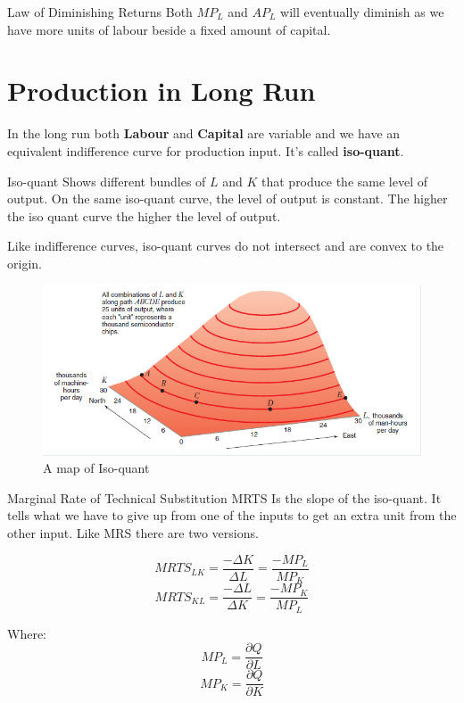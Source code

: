 \documentclass[../ECON-281-Notes.tex]{subfiles}
\begin{document}
\begin{Theorem}
    {Law of Diminishing Returns}
    Both \(MP_L\) and \(AP_L\) will eventually diminish as we have more units of labour beside a fixed amount of capital. 
\end{Theorem}

\section{Production in Long Run}
In the long run both \textbf{Labour} and \textbf{Capital} are variable and we have an equivalent indifference curve for production input. It's called \textbf{iso-quant}.

\begin{Definition}
    {Iso-quant}
    Shows different bundles of \(L\) and \(K\) that produce the same level of output.
    On the same iso-quant curve, the level of output is constant. The higher the iso quant curve the higher the level of output.

    Like indifference curves, iso-quant curves do not intersect and are convex to the origin. 
\end{Definition}
\begin{figure}[h]
    \centering
    \includegraphics[width=\columnwidth]{../assets/isoquant.png}
    \caption{A map of Iso-quant}
    \label{fig:isoquant}
\end{figure}

\begin{Definition}
    {Marginal Rate of Technical Substitution MRTS}
    Is the slope of the iso-quant. It tells what we have to give up from one of the inputs to get an extra unit from the other input. Like MRS there are two versions. 

    \begin{equation}
        MRTS_{LK} = \frac{-\Delta K}{\Delta L} = \frac{-MP_L}{MP_K}
    \end{equation}
    \begin{equation}
        MRTS_{KL} = \frac{-\Delta L}{\Delta K} = \frac{-MP_K}{MP_L}
    \end{equation}
    
    Where:
    \begin{equation}
        MP_L = \frac{\partial Q}{\partial L}   
    \end{equation}
    \begin{equation}
        MP_K = \frac{\partial Q}{\partial K}
    \end{equation}
\end{Definition}
\end{document}
